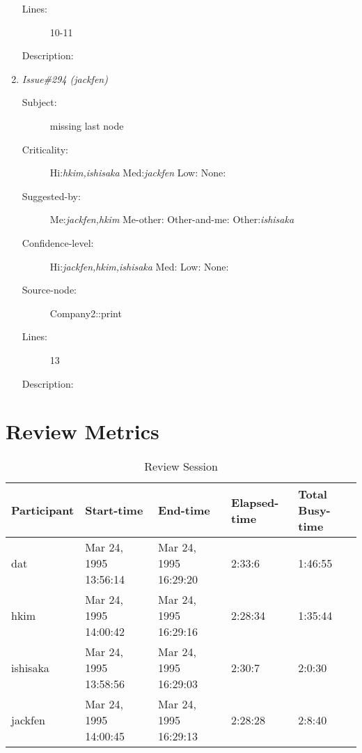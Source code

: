 \begin{enumerate}
\begin{description}
\item [Lines:] 10-11

\item [Description:] 
\end{description}
\item {\it Issue\#294 (jackfen)}
\begin{description}
\item [Subject:] missing last node
\item [Criticality:] Hi:{\it hkim,ishisaka} Med:{\it jackfen} Low:{\it } None:{\it }
\item [Suggested-by:] Me:{\it jackfen,hkim} Me-other:{\it } Other-and-me:{\it } Other:{\it ishisaka}
\item [Confidence-level:] Hi:{\it jackfen,hkim,ishisaka} Med:{\it } Low:{\it } None:{\it }
\item [Source-node:] Company2::print

\item [Lines:] 13

\item [Description:] 
\end{description}
\end{enumerate}
\section{Review Metrics}
\begin{table}[hb]
\begin{center}
\begin{tabular}{|l|l|l|l|l|}
\hline
Participant & Start-time & End-time & Elapsed-time & Total Busy-time \\
\hline
dat & Mar 24, 1995 13:56:14 & Mar 24, 1995 16:29:20 & 2:33:6 & 1:46:55 \\
hkim & Mar 24, 1995 14:00:42 & Mar 24, 1995 16:29:16 & 2:28:34 & 1:35:44 \\
ishisaka & Mar 24, 1995 13:58:56 & Mar 24, 1995 16:29:03 & 2:30:7 & 2:0:30 \\
jackfen & Mar 24, 1995 14:00:45 & Mar 24, 1995 16:29:13 & 2:28:28 & 2:8:40 \\
\hline
\end{tabular}
\end{center}
\caption{Review Session}
\end{table}


